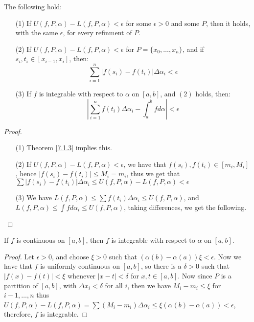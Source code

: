 \begin{theorem}\label{7.1.6}
    The following hold:
        \begin{enumerate}
            \item[(1)] If $U(f,P,\alpha)-L(f,P,\alpha)<\epsilon$ for some
                $\epsilon>0$ and some $P$, then it holds, with the same
                $\epsilon$, for every refinment of  $P$.

            \item[(2)] If $U(f,P,\alpha)-L(f,P,\alpha)<\epsilon$ for $P=\{x_0, \dots,
                x_n\}$, and if $s_i,t_i \in [x_{i-1},x_i]$, then:
                   \begin{equation}
                       \sum_{i=1}^{n}{|f(s_i)-f(t_i)|\Delta\alpha_i}<\epsilon
                   \end{equation}

               \item[(3)] If $f$ is integrable with respect to  $\alpha$ on  $[a,b]$,
                   and  $(2)$ holds, then:
                   \begin{equation}
                       |\sum_{i=1}^{n}{f(t_i)\Delta{\alpha_i}}-\int_{a}^{b}{f}d\alpha|<\epsilon
                   \end{equation}
        \end{enumerate}
\end{theorem}
\begin{proof}
    \begin{enumerate}
        \item[(1)] Theorem \ref{7.1.3} implies this.

        \item[(2)] If $U(f,P,\alpha)-L(f,P,\alpha)<\epsilon$, we have that
            $f(s_i),f(t_i) \in [m_i,M_i]$, hence $|f(s_i)-f(t_i)| \leq M_i=m_i$,
            thus we get that  $\sum{|f(s_i)-f(t_i)|\Delta{\alpha_i}} \leq U(f,P,\alpha)-L(f,P,\alpha)<\epsilon$

        \item[(3)] We have $L(f,P,\alpha) \leq \sum{f(t_i)\Delta{\alpha_i}} \leq
    U(f,P,\alpha)$, and  $L(f,P,\alpha) \leq \int{f}d\alpha_i \leq
            U(f,P,\alpha)$, taking differences, we get the following.
    \end{enumerate}
\end{proof}

\begin{theorem}\label{7.1.7}
    If $f$ is continuous on  $[a,b]$, then  $f$ is integrable with respect to
    $\alpha$ on  $[a,b]$.
\end{theorem}
\begin{proof}
    Let $\epsilon>0$, and choose  $\xi>0$ such that
    $(\alpha(b)-\alpha(a))\xi<\epsilon$. Now we have that  $f$ is uniformly
    continuous on  $[a,b]$, so there is a  $\delta>0$ such that
    $|f(x)-f(t)|<\xi$ whenever $|x-t|<\delta$ for $x,t \in [a,b]$. Now since $P$
    is a partition of  $[a,b]$, with  $\Delta{x_i}<\delta$ for all  $i$, then we
    have $M_i-m_i \leq \xi$ for  $i-1, \dots, n$ thus
    $U(f,P,\alpha)-L(f,P,\alpha)=\sum{(M_i-m_i)\Delta{\alpha_i}} \leq
    \xi(\alpha(b)-\alpha(a))<\epsilon$, therefore,  $f$ is integrable.
\end{proof}

